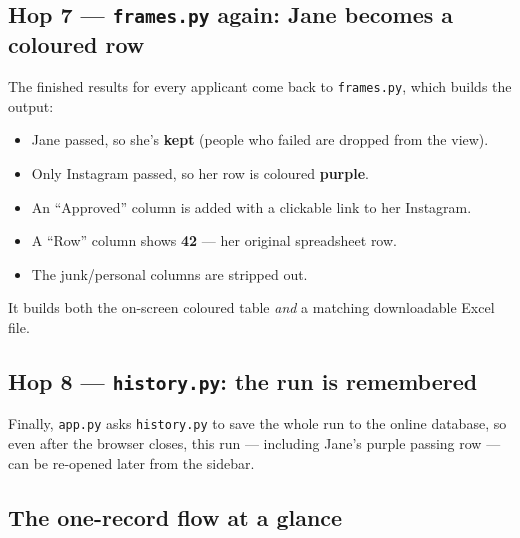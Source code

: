 \documentclass[11pt]{article}
\newcommand{\file}[1]{\texttt{\color{inkdark}#1}}
\begin{document}
\subsection{Hop 7 — \file{frames.py} again: Jane becomes a coloured row}

The finished results for every applicant come back to \file{frames.py}, which
builds the output:
\begin{itemize}
  \item Jane passed, so she's \textbf{kept} (people who failed are dropped from
  the view).
  \item Only Instagram passed, so her row is coloured \textbf{purple}.
  \item An ``Approved'' column is added with a clickable link to her Instagram.
  \item A ``Row'' column shows \textbf{42} — her original spreadsheet row.
  \item The junk/personal columns are stripped out.
\end{itemize}
It builds both the on-screen coloured table \emph{and} a matching downloadable
Excel file.

\subsection{Hop 8 — \file{history.py}: the run is remembered}

Finally, \file{app.py} asks \file{history.py} to save the whole run to the
online database, so even after the browser closes, this run — including Jane's
purple passing row — can be re-opened later from the sidebar.

\subsection{The one-record flow at a glance}
\end{document}
